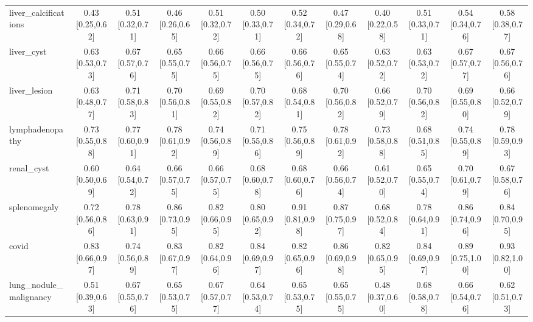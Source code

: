 \begin{tabular}{lccccccccccc}
liver\_calcifications & 0.43 [0.25,0.62] & 0.51 [0.32,0.71] & 0.46 [0.26,0.65] & 0.51 [0.32,0.72] & 0.50 [0.33,0.71] & 0.52 [0.34,0.72] & 0.47 [0.29,0.68] & 0.40 [0.22,0.58] & 0.51 [0.33,0.71] & 0.54 [0.34,0.76] & 0.58 [0.38,0.77] \\
liver\_cyst & 0.63 [0.53,0.73] & 0.67 [0.57,0.76] & 0.65 [0.55,0.75] & 0.66 [0.56,0.75] & 0.66 [0.56,0.75] & 0.66 [0.56,0.76] & 0.65 [0.55,0.74] & 0.63 [0.52,0.72] & 0.63 [0.53,0.72] & 0.67 [0.57,0.77] & 0.67 [0.56,0.76] \\
liver\_lesion & 0.63 [0.48,0.77] & 0.71 [0.58,0.83] & 0.70 [0.56,0.81] & 0.69 [0.55,0.82] & 0.70 [0.57,0.82] & 0.68 [0.54,0.81] & 0.70 [0.56,0.82] & 0.66 [0.52,0.79] & 0.70 [0.56,0.82] & 0.69 [0.55,0.80] & 0.66 [0.52,0.79] \\
lymphadenopathy & 0.73 [0.55,0.88] & 0.77 [0.60,0.91] & 0.78 [0.61,0.92] & 0.74 [0.56,0.89] & 0.71 [0.55,0.86] & 0.75 [0.56,0.89] & 0.78 [0.61,0.92] & 0.73 [0.58,0.88] & 0.68 [0.51,0.85] & 0.74 [0.55,0.89] & 0.78 [0.59,0.93] \\
renal\_cyst & 0.60 [0.50,0.69] & 0.64 [0.54,0.72] & 0.66 [0.57,0.75] & 0.66 [0.57,0.75] & 0.68 [0.60,0.78] & 0.68 [0.60,0.76] & 0.66 [0.56,0.74] & 0.61 [0.52,0.70] & 0.65 [0.55,0.74] & 0.70 [0.61,0.79] & 0.67 [0.58,0.76] \\
splenomegaly & 0.72 [0.56,0.86] & 0.78 [0.63,0.91] & 0.86 [0.73,0.95] & 0.82 [0.66,0.95] & 0.80 [0.65,0.92] & 0.91 [0.81,0.98] & 0.87 [0.75,0.97] & 0.68 [0.52,0.84] & 0.78 [0.64,0.91] & 0.86 [0.74,0.96] & 0.84 [0.70,0.95] \\
covid & 0.83 [0.66,0.97] & 0.74 [0.56,0.89] & 0.83 [0.67,0.97] & 0.82 [0.64,0.96] & 0.84 [0.69,0.97] & 0.82 [0.65,0.96] & 0.86 [0.69,0.98] & 0.82 [0.65,0.95] & 0.84 [0.69,0.97] & 0.89 [0.75,1.00] & 0.93 [0.82,1.00] \\
lung\_nodule\_malignancy & 0.51 [0.39,0.63] & 0.67 [0.55,0.76] & 0.65 [0.53,0.75] & 0.67 [0.57,0.77] & 0.64 [0.53,0.74] & 0.65 [0.53,0.75] & 0.65 [0.55,0.75] & 0.48 [0.37,0.60] & 0.68 [0.58,0.78] & 0.66 [0.54,0.76] & 0.62 [0.51,0.73] \\
\bottomrule
\end{tabular}
